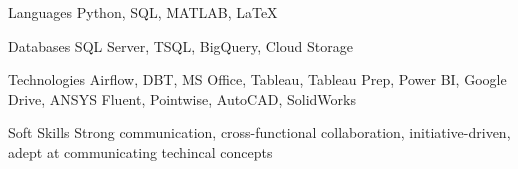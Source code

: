 
\begin{cvskills}
  \cvskill
    {Languages} %
    {Python, SQL, MATLAB, LaTeX} %
  
  \cvskill
    {Databases} %
    {SQL Server, TSQL, BigQuery, Cloud Storage} %
    
  \cvskill
    {Technologies} %
    {Airflow, DBT, MS Office, Tableau, Tableau Prep, Power BI, Google Drive, ANSYS Fluent, Pointwise, AutoCAD, SolidWorks} %
    
  \cvskill
    {Soft Skills} %
    {Strong communication, cross-functional collaboration, initiative-driven, adept at communicating techincal concepts}

\end{cvskills}

